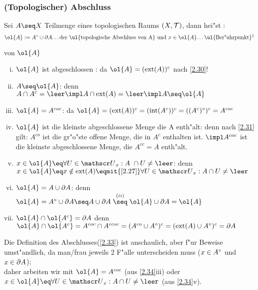 \subsubsection{(Topologischer) Abschluss}
\begin{definition}\label{2.33}
Sei $A\seq X$ Teilmenge eines topologischen Raums $(X, \mathcal T)$, dann hei"st :
$$\ol{A}:= \inn{A}\cup \bd{A}\mbox{\dots der \ul{topologische Abschluss von A} und }
x\in \ol{A} \mbox{\dots \ul{Ber"uhrpunkt}\footnotemark}$$
\end{definition}
\vspace*{-1.2cm}
\begin{beob}\label{2.34}{ von $\ol{A}$}
\begin{enumerate}[(i)]
\item $\ol{A}$ ist abgeschlossen : da $\ol{A}=(\ext{A})^c$ nach \ref{2.30}!
\item $A\seq \ol{A}$: denn $A\cap A^c=\leer \impl A\cap \ext{A}=\leer \impl A\seq \ol{A}$
\item $\ol{A} = A^{coc}$: da $\ol{A}=(\ext{A})^c=(\mbox{int}(A^c))^c=(\inn{(A^c )} )^c=A^{coc}$
\item $\ol{A}$ ist die kleinste abgeschlossene Menge die A enth"alt: denn nach \ref{2.31} gilt: $A^{co}$ ist die gr"o"ste offene Menge, die in $A^c$ enthalten ist. $\impl A^{coc}$ ist die kleinste abgeschlossene Menge, die $A^{cc}=A$ enth"alt.
\item $x\in\ol{A}\eq\forall U \in\umg{U}{x}:A \cap U\neq \leer$: denn $x\in\ol{A}\eq x\notin\ext{A}\eqmit{\ref{2.27}}\forall U\in\umg{U}{x}:A\cap U\neq \leer$
\item $\ol{A}=A\cup\bd{A}$: denn $\ol{A}=\inn{A}\cup\bd{A} \seq A\cup\bd{A}\stackrel{(ii)}{\seq}\ol{A}\cup\bd{A}=\ol{A}$
\item $\ol{A}\cap\ol{A^c}=\bd{A}$ denn $ \ol{A}\cap\ol{A^c}=A^{coc}\cap A^{ccoc}=(A^{co}\cup \inn{A})^c=(\ext{A}\cup\inn{A})^c=\bd{A}$
\end{enumerate}
\end{beob}
Die Definition des Abschlusses(\ref{2.33}) ist anschaulich, aber f"ur Beweise umst"andlich, da man/frau jeweils 2 F"alle unterscheiden muss ($x\in A^\circ$ und $x\in\partial A$);\\
daher arbeiten wir mit $\ol{A} = A^{coc}$ (aus \ref{2.34}iii) oder\\
$x\in\ol{A}\eq\forall U\in\umg{U}{x}:A\cap U\neq\leer$ (aus \ref{2.34}v).

